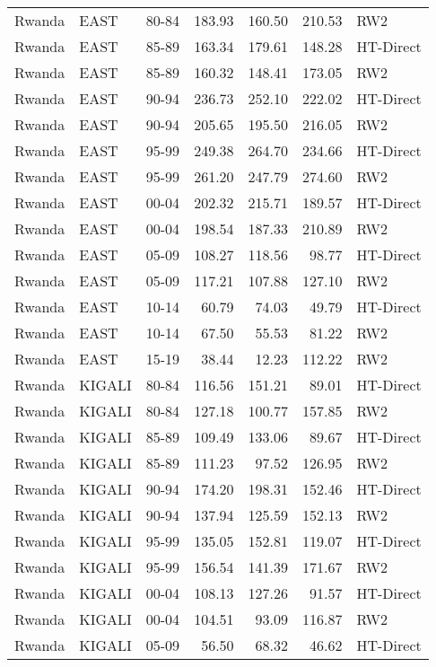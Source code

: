 \begin{longtable}{lllrrrl}
  Rwanda & EAST & 80-84 & 183.93 & 160.50 & 210.53 & RW2 \\ 
  Rwanda & EAST & 85-89 & 163.34 & 179.61 & 148.28 & HT-Direct \\ 
  Rwanda & EAST & 85-89 & 160.32 & 148.41 & 173.05 & RW2 \\ 
  Rwanda & EAST & 90-94 & 236.73 & 252.10 & 222.02 & HT-Direct \\ 
  Rwanda & EAST & 90-94 & 205.65 & 195.50 & 216.05 & RW2 \\ 
  Rwanda & EAST & 95-99 & 249.38 & 264.70 & 234.66 & HT-Direct \\ 
  Rwanda & EAST & 95-99 & 261.20 & 247.79 & 274.60 & RW2 \\ 
  Rwanda & EAST & 00-04 & 202.32 & 215.71 & 189.57 & HT-Direct \\ 
  Rwanda & EAST & 00-04 & 198.54 & 187.33 & 210.89 & RW2 \\ 
  Rwanda & EAST & 05-09 & 108.27 & 118.56 & 98.77 & HT-Direct \\ 
  Rwanda & EAST & 05-09 & 117.21 & 107.88 & 127.10 & RW2 \\ 
  Rwanda & EAST & 10-14 & 60.79 & 74.03 & 49.79 & HT-Direct \\ 
  Rwanda & EAST & 10-14 & 67.50 & 55.53 & 81.22 & RW2 \\ 
  Rwanda & EAST & 15-19 & 38.44 & 12.23 & 112.22 & RW2 \\ 
  Rwanda & KIGALI & 80-84 & 116.56 & 151.21 & 89.01 & HT-Direct \\ 
  Rwanda & KIGALI & 80-84 & 127.18 & 100.77 & 157.85 & RW2 \\ 
  Rwanda & KIGALI & 85-89 & 109.49 & 133.06 & 89.67 & HT-Direct \\ 
  Rwanda & KIGALI & 85-89 & 111.23 & 97.52 & 126.95 & RW2 \\ 
  Rwanda & KIGALI & 90-94 & 174.20 & 198.31 & 152.46 & HT-Direct \\ 
  Rwanda & KIGALI & 90-94 & 137.94 & 125.59 & 152.13 & RW2 \\ 
  Rwanda & KIGALI & 95-99 & 135.05 & 152.81 & 119.07 & HT-Direct \\ 
  Rwanda & KIGALI & 95-99 & 156.54 & 141.39 & 171.67 & RW2 \\ 
  Rwanda & KIGALI & 00-04 & 108.13 & 127.26 & 91.57 & HT-Direct \\ 
  Rwanda & KIGALI & 00-04 & 104.51 & 93.09 & 116.87 & RW2 \\ 
  Rwanda & KIGALI & 05-09 & 56.50 & 68.32 & 46.62 & HT-Direct \\ 

\end{longtable}
